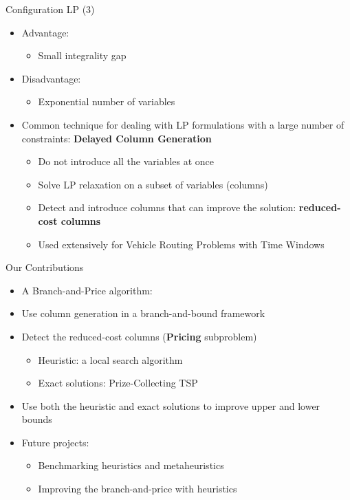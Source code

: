 \begin{frame}[t]{Configuration LP (3)}
    \begin{itemize}
        \item<1-> Advantage:
            \begin{itemize}
                \item<2-> Small integrality gap
            \end{itemize}
        \item<3-> Disadvantage: 
            \begin{itemize}
                \item<4-> Exponential number of variables
            \end{itemize}
        \item<5-> Common technique for dealing with LP formulations with a large number of constraints: \textbf{Delayed Column Generation}
            \begin{itemize}
                \item<6-> Do not introduce all the variables at once
                \item<7-> Solve LP relaxation on a subset of variables (columns)
                \item<8-> Detect and introduce columns that can improve the solution: \textbf{reduced-cost columns}
                \item<9-> Used extensively for Vehicle Routing Problems with Time Windows
            \end{itemize}
    \end{itemize}
\end{frame}

\begin{frame}[t]{Our Contributions}
    \label{our_method_bp}
    \begin{itemize}
        \item<1-> A \alert{Branch-and-Price} algorithm: 
        \item<2-> Use column generation in a branch-and-bound framework
        \item<3-> Detect the reduced-cost columns (\textbf{Pricing} subproblem)
            \begin{itemize}
                \item<4-> Heuristic: a \alert{local search} algorithm 
                \item<5-> Exact solutions: \alert{Prize-Collecting TSP}
            \end{itemize}
        \item<6-> Use both the heuristic and exact solutions to improve upper and lower bounds \hyperlink{CLP2}{}        
        \item<7-> Future projects:
            \begin{itemize}
                \item<8-> Benchmarking heuristics and metaheuristics
                \item<9-> Improving the branch-and-price with heuristics
            \end{itemize}
    \end{itemize}
\end{frame}


